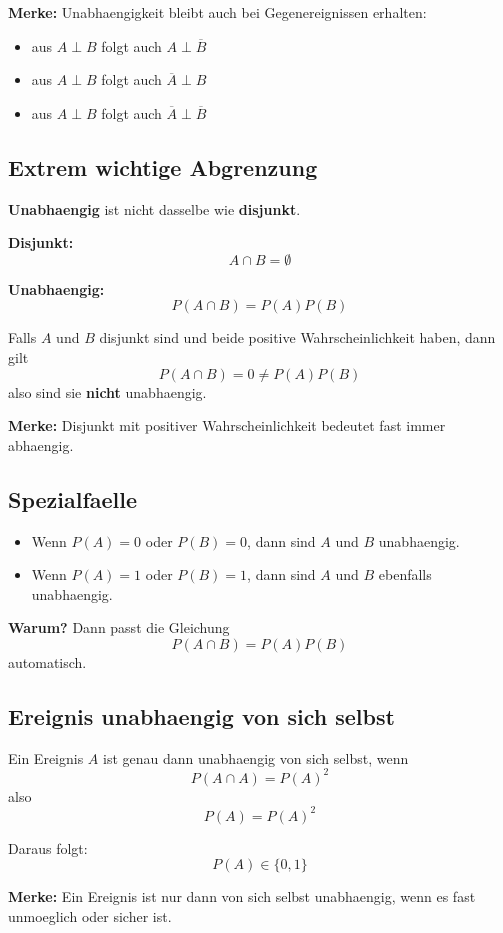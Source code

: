 \documentclass[a4paper,11pt]{article}
\begin{document}
\textbf{Merke:}
Unabhaengigkeit bleibt auch bei Gegenereignissen erhalten:
\begin{itemize}
  \item aus $A \perp B$ folgt auch $A \perp \overline{B}$
  \item aus $A \perp B$ folgt auch $\overline{A} \perp B$
  \item aus $A \perp B$ folgt auch $\overline{A} \perp \overline{B}$
\end{itemize}

\subsection{Extrem wichtige Abgrenzung}
\textbf{Unabhaengig} ist nicht dasselbe wie \textbf{disjunkt}.

\textbf{Disjunkt:}
\[
A \cap B = \emptyset
\]

\textbf{Unabhaengig:}
\[
P(A \cap B)=P(A)P(B)
\]

Falls $A$ und $B$ disjunkt sind und beide positive Wahrscheinlichkeit haben, dann gilt
\[
P(A \cap B)=0 \neq P(A)P(B)
\]
also sind sie \textbf{nicht} unabhaengig.

\textbf{Merke:}
Disjunkt mit positiver Wahrscheinlichkeit bedeutet fast immer abhaengig.

\subsection{Spezialfaelle}
\begin{itemize}
  \item Wenn $P(A)=0$ oder $P(B)=0$, dann sind $A$ und $B$ unabhaengig.
  \item Wenn $P(A)=1$ oder $P(B)=1$, dann sind $A$ und $B$ ebenfalls unabhaengig.
\end{itemize}

\textbf{Warum?}
Dann passt die Gleichung
\[
P(A \cap B)=P(A)P(B)
\]
automatisch.

\subsection{Ereignis unabhaengig von sich selbst}
Ein Ereignis $A$ ist genau dann unabhaengig von sich selbst, wenn
\[
P(A \cap A)=P(A)^2
\]
also
\[
P(A)=P(A)^2
\]

Daraus folgt:
\[
P(A)\in\{0,1\}
\]

\textbf{Merke:}
Ein Ereignis ist nur dann von sich selbst unabhaengig, wenn es fast unmoeglich oder sicher ist.
\end{document}
